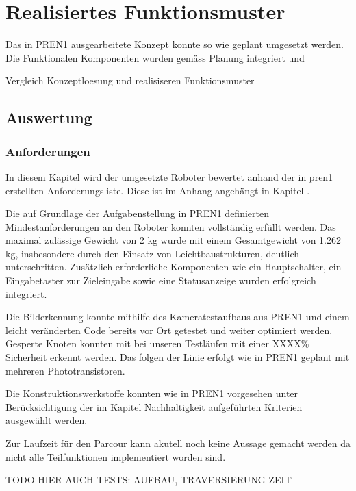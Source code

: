 \section{Realisiertes Funktionsmuster}

Das in PREN1 ausgearbeitete Konzept konnte so wie geplant umgesetzt werden. Die Funktionalen Komponenten wurden gemäss Planung integriert und 

Vergleich  Konzeptloesung und realisiseren Funktionsmuster



\subsection{Auswertung}

\subsubsection{Anforderungen}

In diesem Kapitel wird der umgesetzte Roboter bewertet anhand der in \acrshort{pren1} erstellten Anforderungsliste. Diese ist im Anhang angehängt in Kapitel .

Die auf Grundlage der Aufgabenstellung in PREN1 definierten Mindestanforderungen an den Roboter konnten vollständig erfüllt werden. Das maximal zulässige Gewicht von 2 kg wurde mit einem Gesamtgewicht von 1.262 kg, insbesondere durch den Einsatz von Leichtbaustrukturen, deutlich unterschritten. Zusätzlich erforderliche Komponenten wie ein Hauptschalter, ein Eingabetaster zur Zieleingabe sowie eine Statusanzeige wurden erfolgreich integriert.

Die Bilderkennung konnte mithilfe des Kameratestaufbaus aus PREN1 und einem leicht veränderten Code bereits vor Ort getestet und weiter optimiert werden. Gesperte Knoten konnten mit bei unseren Testläufen mit einer XXXX\% Sicherheit erkennt werden. Das folgen der Linie erfolgt wie in PREN1 geplant mit mehreren Phototransistoren. 

Die Konstruktionswerkstoffe konnten wie in PREN1 vorgesehen unter Berücksichtigung der im Kapitel Nachhaltigkeit aufgeführten Kriterien ausgewählt werden.

Zur Laufzeit für den Parcour kann akutell noch keine Aussage gemacht werden da nicht alle Teilfunktionen implementiert worden sind. 



TODO HIER AUCH TESTS: AUFBAU, TRAVERSIERUNG ZEIT